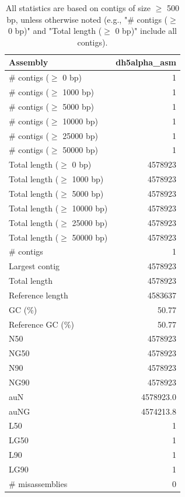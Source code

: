 \documentclass[12pt,a4paper]{article}
\begin{document}
\begin{table}[ht]
\begin{center}
\caption{All statistics are based on contigs of size $\geq$ 500 bp, unless otherwise noted (e.g., "\# contigs ($\geq$ 0 bp)" and "Total length ($\geq$ 0 bp)" include all contigs).}
\begin{tabular}{|l*{1}{|r}|}
\hline
Assembly & dh5alpha\_asm \\ \hline
\# contigs ($\geq$ 0 bp) & 1 \\ \hline
\# contigs ($\geq$ 1000 bp) & 1 \\ \hline
\# contigs ($\geq$ 5000 bp) & 1 \\ \hline
\# contigs ($\geq$ 10000 bp) & 1 \\ \hline
\# contigs ($\geq$ 25000 bp) & 1 \\ \hline
\# contigs ($\geq$ 50000 bp) & 1 \\ \hline
Total length ($\geq$ 0 bp) & 4578923 \\ \hline
Total length ($\geq$ 1000 bp) & 4578923 \\ \hline
Total length ($\geq$ 5000 bp) & 4578923 \\ \hline
Total length ($\geq$ 10000 bp) & 4578923 \\ \hline
Total length ($\geq$ 25000 bp) & 4578923 \\ \hline
Total length ($\geq$ 50000 bp) & 4578923 \\ \hline
\# contigs & 1 \\ \hline
Largest contig & 4578923 \\ \hline
Total length & 4578923 \\ \hline
Reference length & 4583637 \\ \hline
GC (\%) & 50.77 \\ \hline
Reference GC (\%) & 50.77 \\ \hline
N50 & 4578923 \\ \hline
NG50 & 4578923 \\ \hline
N90 & 4578923 \\ \hline
NG90 & 4578923 \\ \hline
auN & 4578923.0 \\ \hline
auNG & 4574213.8 \\ \hline
L50 & 1 \\ \hline
LG50 & 1 \\ \hline
L90 & 1 \\ \hline
LG90 & 1 \\ \hline
\# misassemblies & 0 \\ \hline

\end{tabular}
\end{center}
\end{table}
\end{document}
